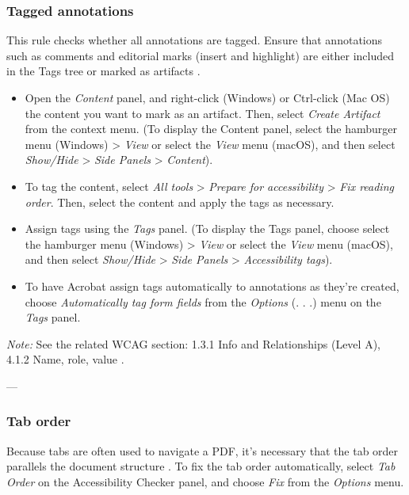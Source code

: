 \subsubsection{Tagged annotations}
\label{subsubsec:acrobat-tagged-annotations}
This rule checks whether all annotations are tagged. Ensure that annotations such as comments and editorial marks (insert and highlight) are either included in the Tags tree or marked as artifacts \cite{AdobeHelpX}.
\begin{itemize}
    \item Open the \emph{Content} panel, and right-click (Windows) or Ctrl-click (Mac OS) the content you want to mark as an artifact. Then, select \emph{Create Artifact} from the context menu. (To display the Content panel, select the hamburger menu (Windows) > \emph{View} or select the \emph{View} menu (macOS), and then select \emph{Show/Hide} > \emph{Side Panels} > \emph{Content}).
    \item To tag the content, select \emph{All tools} > \emph{Prepare for accessibility} > \emph{Fix reading order}. Then, select the content and apply the tags as necessary.
    \item Assign tags using the \emph{Tags} panel. (To display the Tags panel, choose select the hamburger menu (Windows) > \emph{View} or select the \emph{View} menu (macOS), and then select \emph{Show/Hide} > \emph{Side Panels} > \emph{Accessibility tags}).
    \item To have Acrobat assign tags automatically to annotations as they're created, choose \emph{Automatically tag form fields} from the \emph{Options} (. . .) menu on the \emph{Tags} panel.
\end{itemize}

\vspace{0.5em}
\noindent\textit{Note:} See the related WCAG section: 1.3.1 Info and Relationships (Level A), 4.1.2 Name, role, value \cite{WCAG}.

---

\subsubsection{Tab order}
\label{subsubsec:acrobat-tab-order}
Because tabs are often used to navigate a PDF, it's necessary that the tab order parallels the document structure \cite{AdobeHelpX}.
To fix the tab order automatically, select \emph{Tab Order} on the Accessibility Checker panel, and choose \emph{Fix} from the \emph{Options} menu.

